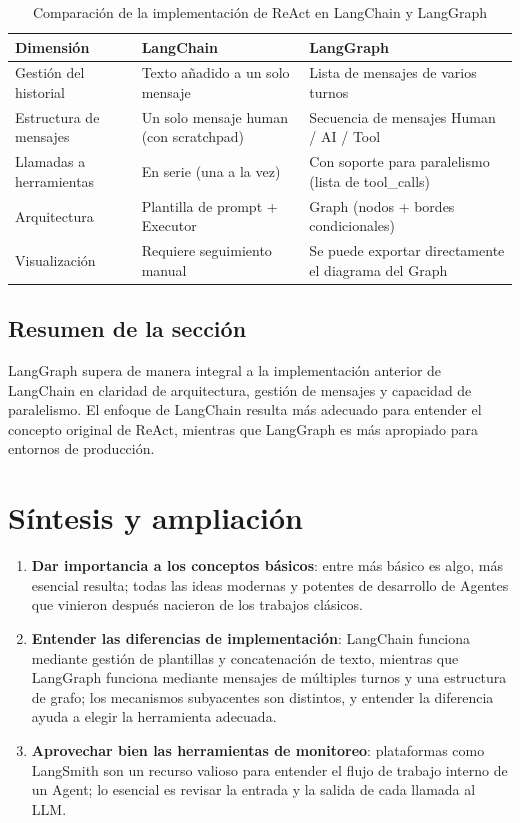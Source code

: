 \documentclass[a4paper]{article}
\begin{document}
\begin{table}[H]
\centering
\begin{tabular}{lll}
\toprule
\textbf{Dimensión} & \textbf{LangChain} & \textbf{LangGraph} \\
\midrule
Gestión del historial & Texto añadido a un solo mensaje & Lista de mensajes de varios turnos \\
Estructura de mensajes & Un solo mensaje human (con scratchpad) & Secuencia de mensajes Human / AI / Tool \\
Llamadas a herramientas & En serie (una a la vez) & Con soporte para paralelismo (lista de tool\_calls) \\
Arquitectura & Plantilla de prompt + Executor & Graph (nodos + bordes condicionales) \\
Visualización & Requiere seguimiento manual & Se puede exportar directamente el diagrama del Graph \\
\bottomrule
\end{tabular}
\caption{Comparación de la implementación de ReAct en LangChain y LangGraph}
\end{table}

\subsection{Resumen de la sección}
LangGraph supera de manera integral a la implementación anterior de LangChain en claridad de arquitectura, gestión de mensajes y capacidad de paralelismo. El enfoque de LangChain resulta más adecuado para entender el concepto original de ReAct, mientras que LangGraph es más apropiado para entornos de producción.

\section{Síntesis y ampliación}

\begin{enumerate}
    \item \textbf{Dar importancia a los conceptos básicos}: entre más básico es algo, más esencial resulta; todas las ideas modernas y potentes de desarrollo de Agentes que vinieron después nacieron de los trabajos clásicos.
    \item \textbf{Entender las diferencias de implementación}: LangChain funciona mediante gestión de plantillas y concatenación de texto, mientras que LangGraph funciona mediante mensajes de múltiples turnos y una estructura de grafo; los mecanismos subyacentes son distintos, y entender la diferencia ayuda a elegir la herramienta adecuada.
    \item \textbf{Aprovechar bien las herramientas de monitoreo}: plataformas como LangSmith son un recurso valioso para entender el flujo de trabajo interno de un Agent; lo esencial es revisar la entrada y la salida de cada llamada al LLM.
\end{enumerate}
\end{document}
